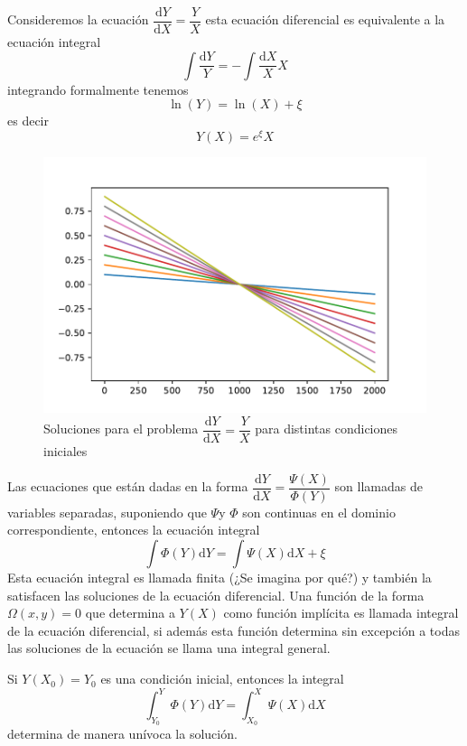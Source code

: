 \begin{exampleT}
Consideremos la ecuación $\dfrac{\mathrm{d}Y}{\mathrm{d}X}=\dfrac{Y}{X}$ esta ecuación diferencial es equivalente a la ecuación integral 
$$
\int \dfrac{\mathrm{d}Y}{Y} =-\int \dfrac{\mathrm{d}X}{X}X
$$
integrando formalmente tenemos
$$
\ln(Y)=\ln(X)+\xi
$$
es decir
$$
Y(X)=e^{\xi}X
$$
\begin{figure}[H]
    \centering
    \includegraphics[scale=0.85]{ejemplo2.pdf}
    \caption{Soluciones para el problema $\dfrac{\mathrm{d}Y}{\mathrm{d}X}=\dfrac{Y}{X}$ para distintas condiciones iniciales}
    \label{fig:ej2}
\end{figure}
\end{exampleT}
 
 Las ecuaciones que están dadas en la forma $\dfrac{\mathrm{d}Y}{\mathrm{d}X}=\dfrac{\Psi(X)}{\Phi(Y)}$ son llamadas de variables separadas, suponiendo que $\Psi$y $\Phi$ son continuas en el dominio correspondiente, entonces la ecuación integral
 $$
 \int\Phi(Y)\mathrm{d}Y=\int\Psi(X)\mathrm{d}X+\xi
 $$
 Esta ecuación integral es llamada finita (¿Se imagina por qué?) y también la satisfacen las soluciones de la ecuación diferencial. Una función de la forma $\Omega(x,y)=0$ que determina a $Y(X)$ como función implícita es llamada integral de la ecuación diferencial, si además esta función determina sin excepción  a todas las soluciones de la ecuación se llama una integral general.
 
 Si $Y(X_0)=Y_0$ es una condición inicial, entonces la integral
 $$
 \int_{Y_0}^{Y}\Phi(Y)\mathrm{d}Y=\int_{X_0}^{X}\Psi(X)\mathrm{d}X
 $$
determina de manera unívoca la solución.


